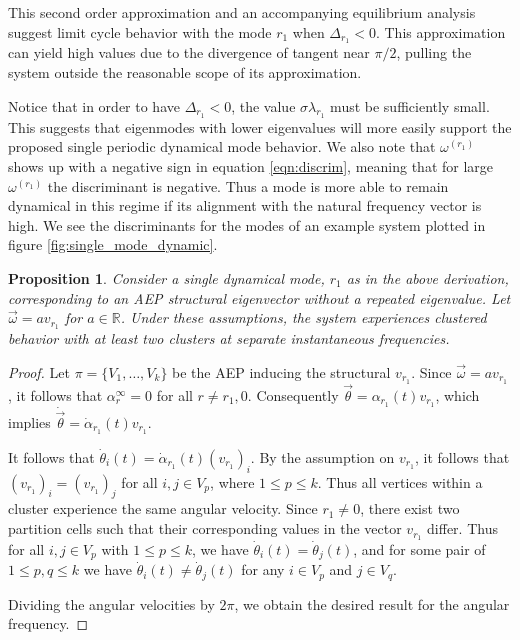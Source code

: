\documentclass[%
 aip,
 amsmath,amssymb,
preprint,
reprint, onecolumn %
]{revtex4-1}
\newcommand{\R}{\mathbb{R}}
\newtheorem{prop}[theorem]{Proposition}
\begin{document}
This second order approximation and an accompanying equilibrium analysis suggest limit cycle behavior with the mode $r_1$ when $\Delta_{r_1}<0$. This approximation can yield high values due to the divergence of tangent near $\pi/2$, pulling the system outside the reasonable scope of its approximation. 

Notice that in order to have $\Delta_{r_1}<0$, the value $\sigma\lambda_{r_1}$ must be sufficiently small. This suggests that eigenmodes with lower eigenvalues will more easily support the proposed single periodic dynamical mode behavior. We also note that $\omega^{(r_1)}$ shows up with a negative sign in equation \ref{eqn:discrim}, meaning that for large $\omega^{(r_1)}$ the discriminant is negative. Thus a mode is more able to remain dynamical in this regime if its alignment with the natural frequency vector is high. We see the discriminants for the modes of an example system plotted in figure \ref{fig:single_mode_dynamic}.

\begin{prop}
    Consider a single dynamical mode, $r_1$ as in the above derivation, corresponding to an AEP structural eigenvector without a repeated eigenvalue. Let $\vec{\omega} = a v_{r_1}$ for $a\in \R$. Under these assumptions, the system experiences clustered behavior with at least two clusters at separate instantaneous frequencies.
\end{prop}
\begin{proof}
    Let $\pi= \{V_1,\dotsc,V_k\}$ be the AEP inducing the structural $v_{r_1}$. Since $\vec{\omega} = a v_{r_1}$, it follows that $\alpha_r^{\infty}=0$ for all $r\neq r_1,0$. Consequently $\vec{\theta}= \alpha_{r_1}(t) v_{r_1}$, which implies $\dot{\vec{\theta}} = \dot{\alpha}_{r_1}(t) v_{r_1}$. 

    It follows that $\dot{\theta}_i(t) =\dot{ \alpha}_{r_1}(t) (v_{r_1})_i$. By the assumption on $v_{r_1}$, it follows that $(v_{r_1})_i= (v_{r_1})_j$ for all $i,j\in V_p$, where $1\leq p\leq k$. Thus all vertices within a cluster experience the same angular velocity. Since $r_1\neq 0$, there exist two partition cells such that their corresponding values in the vector $v_{r_1}$ differ. Thus for all $i,j\in V_p$ with $1\leq p\leq k$, we have $\dot{\theta}_i(t) = \dot{\theta}_j(t)$, and for some pair of $1\leq p, q\leq k$ we have $\dot{\theta}_i(t) \neq \dot{\theta}_j(t)$ for any $i\in V_p$ and $j\in V_q$.

    Dividing the angular velocities by $2\pi$, we obtain the desired result for the angular frequency.
\end{proof}
\end{document}
